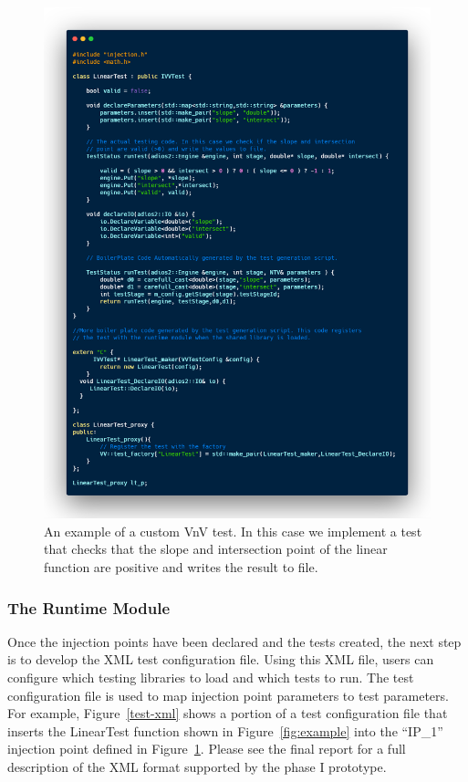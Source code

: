 \begin{figure}
\centering
 \includegraphics[height=0.9\textheight, width=\textwidth]{./narrative/figures/test-examp.png}
 \caption{An example of a custom VnV test. In this case we implement a test that checks that the slope and intersection point of the linear function are positive and writes
 the result to file. \label{test-examp}}
\end{figure}

\subsubsection{The Runtime Module}

Once the injection points have been declared and the tests created, the next step is to develop the XML test configuration file. Using this XML file, users can configure which testing libraries to load and which tests to run. The test configuration file is used to map injection point parameters to test parameters. For example, Figure~\ref{test-xml} shows a portion of a test configuration file that inserts the LinearTest function shown in Figure~\ref{fig:example} into the ``IP\_1'' injection point defined in Figure~\ref{test-examp}. Please see the final report for a full description of the XML format supported by the phase I prototype.

